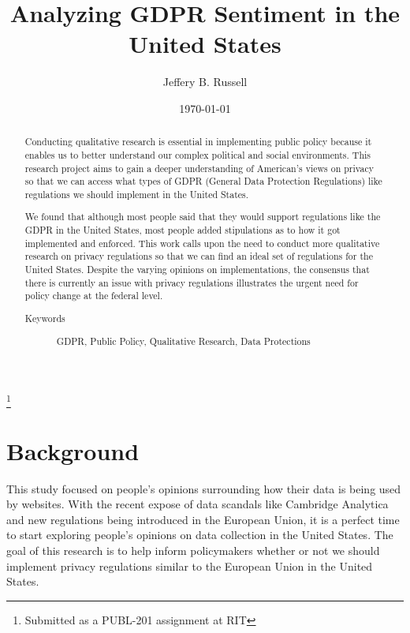 \documentclass[12pt,
 reprint,
nofootinbib,
 amsmath,amssymb,
 aps,
]{revtex4-2}
\begin{document}

\title{Analyzing GDPR Sentiment in the United States}
\thanks{Submitted as a PUBL-201 assignment at RIT}%

\author{Jeffery B. Russell}
%

\date{\today}%

\begin{abstract}
Conducting qualitative research is essential in implementing public policy because it enables us to better understand our complex political and social environments.
This research project aims to gain a deeper understanding of American's views on privacy so that we can access what types of GDPR (General Data Protection Regulations) like regulations we should implement in the United States.

We found that although most people said that they would support regulations like the GDPR in the United States, most people added stipulations as to how it got implemented and enforced. 
This work calls upon the need to conduct more qualitative research on privacy regulations so that we can find an ideal set of regulations for the United States. 
Despite the varying opinions on implementations, the consensus that there is currently an issue with privacy regulations illustrates the urgent need for policy change at the federal level. 

\begin{description}
\item[Keywords]
GDPR, Public Policy, Qualitative Research, Data Protections
\end{description}

\end{abstract}
\maketitle


\section{\label{sec:level1}Background}

This study focused on people’s opinions surrounding how their data is being used by websites. 
With the recent expose of data scandals like Cambridge Analytica and new regulations being introduced in the European Union, it is a perfect time to start exploring people’s opinions on data collection in the United States.
The goal of this research is to help inform policymakers whether or not we should implement privacy regulations similar to the European Union in the United States.
\end{document}
